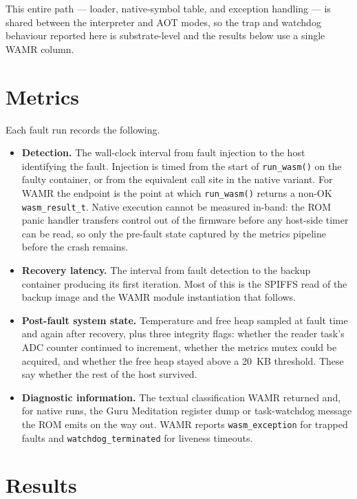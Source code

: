 \documentclass[12pt, a4paper]{report}
\begin{document}
This entire path --- loader, native-symbol table, and exception handling --- is shared between the interpreter and AOT modes, so the trap and watchdog behaviour reported here is substrate-level and the results below use a single WAMR column.

\section{Metrics}
\label{sec:fault-metrics}

Each fault run records the following.

\begin{itemize}
  \item \textbf{Detection.} The wall-clock interval from fault injection to the host identifying the fault. Injection is timed from the start of \texttt{run\_wasm()} on the faulty container, or from the equivalent call site in the native variant. For WAMR the endpoint is the point at which \texttt{run\_wasm()} returns a non-OK \texttt{wasm\_result\_t}. Native execution cannot be measured in-band: the ROM panic handler transfers control out of the firmware before any host-side timer can be read, so only the pre-fault state captured by the metrics pipeline before the crash remains.
  \item \textbf{Recovery latency.} The interval from fault detection to the backup container producing its first iteration. Most of this is the SPIFFS read of the backup image and the WAMR module instantiation that follows.
  \item \textbf{Post-fault system state.} Temperature and free heap sampled at fault time and again after recovery, plus three integrity flags: whether the reader task's ADC counter continued to increment, whether the metrics mutex could be acquired, and whether the free heap stayed above a 20~KB threshold. These say whether the rest of the host survived.
  \item \textbf{Diagnostic information.} The textual classification WAMR returned and, for native runs, the Guru Meditation register dump or task-watchdog message the ROM emits on the way out. WAMR reports \texttt{wasm\_exception} for trapped faults and \texttt{watchdog\_terminated} for liveness timeouts.
\end{itemize}

\section{Results}
\label{sec:fault-results}
\end{document}
